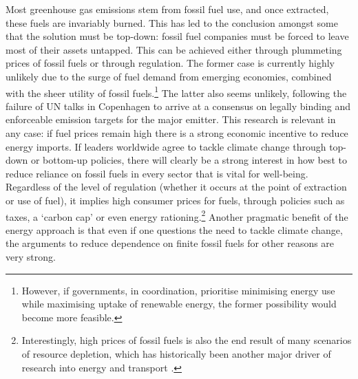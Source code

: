 \documentclass[a4paper, 11pt, twoside]{Thesis}
\begin{document}
Most greenhouse gas emissions stem from fossil fuel use, and once
extracted, these fuels are invariably burned. This has led to the conclusion
amongst some that the solution must be top-down:
fossil fuel companies must be forced to leave most of their assets untapped.
This can be achieved 
either through plummeting prices of fossil fuels or through regulation.
The former case is currently highly unlikely due to the surge of fuel demand from
emerging economies, combined with the sheer utility of fossil
fuels.\footnote{However,
if governments, in coordination,
prioritise minimising energy use while maximising
uptake of renewable energy, the former possibility would become more feasible.
}
The latter also seems unlikely, following the failure of UN talks in
Copenhagen to arrive at a consensus on legally binding
and enforceable emission targets for the major emitter.
This research is relevant in any case: if fuel prices remain high there
is a strong economic incentive to reduce energy imports. If leaders worldwide
agree to tackle climate change through top-down or bottom-up
policies, there will clearly be a strong interest in how best to
reduce reliance on fossil fuels in every sector that is vital for
well-being. Regardless of the level of regulation (whether it
occurs at the point of extraction or use of fuel), it implies high consumer prices
for fuels, through policies such as taxes, a
`carbon cap' or even energy rationing.\footnote{Interestingly, high prices of fossil
fuels is also the end result of many scenarios of resource depletion, which
has historically been another major driver of research into energy and
transport \citep{Fels1973}.}
Another pragmatic benefit of the energy approach is that even if one questions
the need to tackle climate change, the arguments to reduce dependence on
finite fossil fuels for other reasons are very strong.
\end{document}
